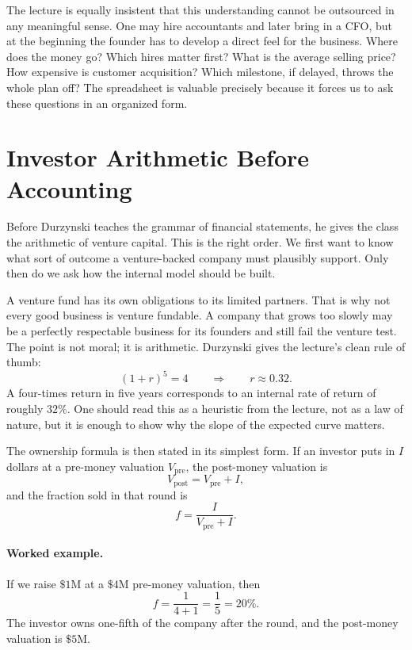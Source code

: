The lecture is equally insistent that this understanding cannot be outsourced in any meaningful sense. One may hire accountants and later bring in a CFO, but at the beginning the founder has to develop a direct feel for the business. Where does the money go? Which hires matter first? What is the average selling price? How expensive is customer acquisition? Which milestone, if delayed, throws the whole plan off? The spreadsheet is valuable precisely because it forces us to ask these questions in an organized form.

\section{Investor Arithmetic Before Accounting}

Before Durzynski teaches the grammar of financial statements, he gives the class the arithmetic of venture capital. This is the right order. We first want to know what sort of outcome a venture-backed company must plausibly support. Only then do we ask how the internal model should be built.

A venture fund has its own obligations to its limited partners. That is why not every good business is venture fundable. A company that grows too slowly may be a perfectly respectable business for its founders and still fail the venture test. The point is not moral; it is arithmetic. Durzynski gives the lecture's clean rule of thumb:
\begin{equation}
(1+r)^5 = 4
\qquad \Rightarrow \qquad
r \approx 0.32.
\end{equation}
A four-times return in five years corresponds to an internal rate of return of roughly \(32\%\). One should read this as a heuristic from the lecture, not as a law of nature, but it is enough to show why the slope of the expected curve matters.

The ownership formula is then stated in its simplest form. If an investor puts in \(I\) dollars at a pre-money valuation \(V_{\mathrm{pre}}\), the post-money valuation is
\begin{equation}
V_{\mathrm{post}} = V_{\mathrm{pre}} + I,
\end{equation}
and the fraction sold in that round is
\begin{equation}
f = \frac{I}{V_{\mathrm{pre}} + I}.
\end{equation}

\paragraph{Worked example.}
If we raise \(\$1\text{M}\) at a \(\$4\text{M}\) pre-money valuation, then
\begin{equation}
f = \frac{1}{4+1} = \frac{1}{5} = 20\%.
\end{equation}
The investor owns one-fifth of the company after the round, and the post-money valuation is \(\$5\text{M}\).

